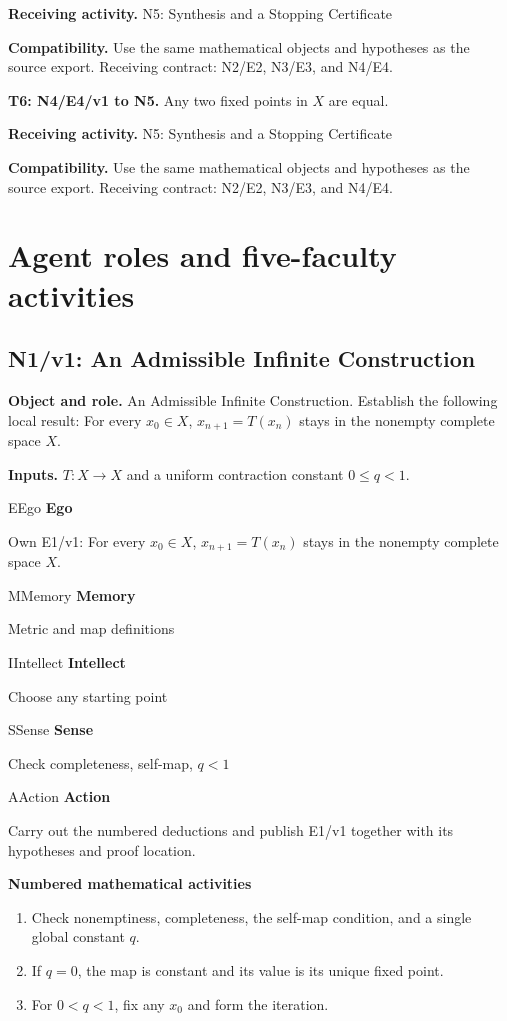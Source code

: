 \documentclass[preprint,12pt,aps,pra,showkeys,amsmath,amssymb,superscriptaddress,floatfix]{revtex4-2}
\theoremstyle{definition}
\theoremstyle{remark}
\newcommand{\mmfaculty}[3]{%
 \begin{mmfacultybox}{#1}{#2}
 {\sffamily\bfseries\color{MMBlue}#2}\par\smallskip #3
 \end{mmfacultybox}}
\newcommand{\field}[2]{\par\smallskip\noindent\textbf{#1.} #2\par}
\begin{document}
\field{Receiving activity}{N5: Synthesis and a Stopping Certificate}

\field{Compatibility}{Use the same mathematical objects and hypotheses as the source export.
Receiving contract: N2/E2, N3/E3, and N4/E4.}

\field{T6: N4/E4/v1 to N5}{Any two fixed points in \(X\) are equal.}

\field{Receiving activity}{N5: Synthesis and a Stopping Certificate}

\field{Compatibility}{Use the same mathematical objects and hypotheses as the source export.
Receiving contract: N2/E2, N3/E3, and N4/E4.}

\endgroup

\clearpage\section{Agent roles and five-faculty activities}\begingroup\small\linespread{1.05}\selectfont{}

\subsection{N1/v1: An Admissible Infinite Construction}

\field{Object and role}{An Admissible Infinite Construction. Establish the following local
result: For every \(x_0\in X\), \(x_{n+1}=T(x_n)\) stays in the nonempty
complete space \(X\).}

\field{Inputs}{\(T:X\to X\) and a uniform contraction constant \(0\le q<1\).}

\mmfaculty{E}{Ego}{Own E1/v1: For every \(x_0\in X\), \(x_{n+1}=T(x_n)\) stays in the
nonempty complete space \(X\).}

\mmfaculty{M}{Memory}{Metric and map definitions}

\mmfaculty{I}{Intellect}{Choose any starting point}

\mmfaculty{S}{Sense}{Check completeness, self-map, \(q<1\)}

\mmfaculty{A}{Action}{Carry out the numbered deductions and publish E1/v1 together with its
hypotheses and proof location.}

\smallskip\noindent\textbf{Numbered mathematical activities}

\begin{enumerate}[label=N1.\arabic*,leftmargin=3.4em]

\item Check nonemptiness, completeness, the self-map condition, and a single
global constant \(q\).

\item If \(q=0\), the map is constant and its value is its unique fixed point.

\item For \(0<q<1\), fix any \(x_0\) and form the iteration.

\end{enumerate}
\end{document}
